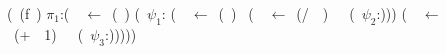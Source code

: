 {\small
  \renewcommand{\arraystretch}{1}{
    \begin{uprogram}
      \UFL (\DEFINE~(f~\px)
       $\pi_1$:(\LET~\py~$\leftarrow $\
      (\length~\px) \IN
       (\SIF~$\psi_1$:\py
      (\LET~\pu~$\leftarrow$~(\Sum~\px)~\IN
       (\LET~\pw~$\leftarrow$\ (/~\pu~\py)~\IN\ \ (\SRETURN~$\psi_2$:\pw)))
      \UNL{5}(\LET~\pz~$\leftarrow$~(+~\py~1)~\IN\ \ (\SRETURN~$\psi_3$:\pz)))))   
  \end{uprogram}}
}
